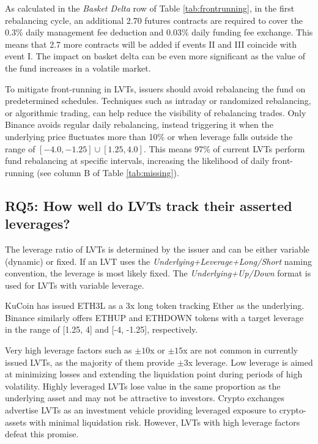 \begin{example}
	As calculated in the \textsl{Basket Delta} row of Table \ref{tab:frontrunning}, in the first rebalancing cycle, an additional 2.70 futures contracts are required to cover the 0.3\% daily management fee deduction and 0.03\% daily funding fee exchange. This means that 2.7 more contracts will be added if events II and III coincide with event I. The impact on basket delta can be even more significant as the value of the fund increases in a volatile market.
\end{example}

To mitigate front-running in LVTs, issuers should avoid rebalancing the fund on predetermined schedules. Techniques such as intraday or randomized rebalancing, or algorithmic trading, can help reduce the visibility of rebalancing trades. Only Binance avoids regular daily rebalancing, instead triggering it when the underlying price fluctuates more than 10\% or when leverage falls outside the range of $\left[-4.0, -1.25 \right] \cup \left[ 1.25, 4.0 \right]$. This means 97\% of current LVTs perform fund rebalancing at specific intervals, increasing the likelihood of daily front-running (see column B of Table \ref{tab:missing}).

\subsection*{RQ5: How well do LVTs track their asserted leverages?}\label{subsec:deviation}
The leverage ratio of LVTs is determined by the issuer and can be either variable (dynamic) or fixed. If an LVT uses the \textsl{Underlying+Leverage+Long/Short} naming convention, the leverage is most likely fixed. The \textsl{Underlying+Up/Down} format is used for LVTs with variable leverage.
\begin{example}
	KuCoin has issued ETH3L as a 3x long token tracking Ether as the underlying. Binance similarly offers ETHUP and ETHDOWN tokens with a target leverage in the range of [1.25, 4] and [-4, -1.25], respectively.
\end{example}

Very high leverage factors such as $\pm10$x or $\pm15$x are not common in currently issued LVTs, as the majority of them provide $\pm3$x leverage. Low leverage is aimed at minimizing losses and extending the liquidation point during periods of high volatility. Highly leveraged LVTs lose value in the same proportion as the underlying asset and may not be attractive to investors. Crypto exchanges advertise LVTs as an investment vehicle providing leveraged exposure to crypto-assets with minimal liquidation risk. However, LVTs with high leverage factors defeat this promise.

